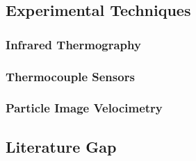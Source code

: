 \pagebreak
\subsection{Experimental Techniques}
\subsubsection{Infrared Thermography}
\subsubsection{Thermocouple Sensors}
\subsubsection{Particle Image Velocimetry}

\pagebreak
\subsection{Literature Gap}
\subsection{}

\pagebreak




